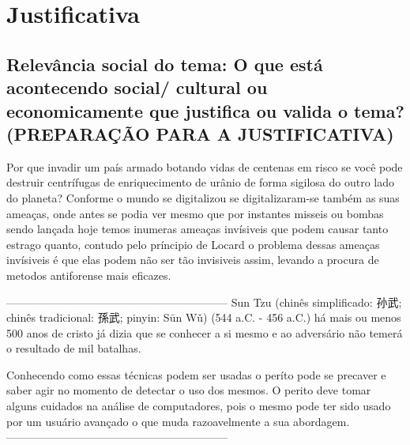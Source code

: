 \section{Justificativa}

\subsection{Relevância social  do tema: O que está acontecendo social/ cultural ou economicamente que justifica ou valida o tema? (PREPARAÇÃO PARA A JUSTIFICATIVA)}

Por que invadir um país armado botando vidas de centenas em risco se você pode destruir centrífugas de enriquecimento de urânio de forma sigilosa do outro lado do planeta? Conforme o mundo se digitalizou se digitalizaram-se também as suas ameaças, onde antes se podia ver mesmo que por instantes misseis ou bombas sendo lançada hoje temos inumeras ameaças invísiveis que podem causar tanto estrago quanto, contudo pelo príncipio de Locard o problema dessas ameaças invísiveis é que elas podem não ser tão invisiveis assim, levando a procura de metodos antiforense mais eficazes.

------------------------------------------------------------
Sun Tzu (chinês simplificado: 孙武; chinês tradicional: 孫武; pinyin: Sūn Wǔ) (544 a.C. - 456 a.C.) há mais ou menos 500 anos de cristo já dizia que se conhecer a si mesmo e ao adversário não temerá o resultado de mil batalhas.

Conhecendo como essas técnicas podem ser usadas o períto pode se precaver e saber agir no momento de detectar o uso dos mesmos. O perito deve tomar alguns cuidados na análise de computadores, pois o mesmo pode ter sido usado por um usuário avançado o que muda razoavelmente a sua abordagem.
------------------------------------------------------------
